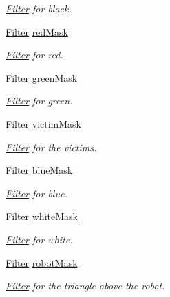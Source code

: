 \begin{DoxyCompactItemize}
\begin{DoxyCompactList}\small\item\em \mbox{\hyperlink{class_filter}{Filter}} for black. \end{DoxyCompactList}\item 
\mbox{\hyperlink{class_filter}{Filter}} \mbox{\hyperlink{class_settings_a4ded995ae1c425f92ad712d2987dce71}{red\+Mask}}
\begin{DoxyCompactList}\small\item\em \mbox{\hyperlink{class_filter}{Filter}} for red. \end{DoxyCompactList}\item 
\mbox{\hyperlink{class_filter}{Filter}} \mbox{\hyperlink{class_settings_a05138be305e15677c8a84ddf27e4d9e8}{green\+Mask}}
\begin{DoxyCompactList}\small\item\em \mbox{\hyperlink{class_filter}{Filter}} for green. \end{DoxyCompactList}\item 
\mbox{\hyperlink{class_filter}{Filter}} \mbox{\hyperlink{class_settings_ad77dc9d3ebdc000309f1279bc0f9e1ea}{victim\+Mask}}
\begin{DoxyCompactList}\small\item\em \mbox{\hyperlink{class_filter}{Filter}} for the victims. \end{DoxyCompactList}\item 
\mbox{\hyperlink{class_filter}{Filter}} \mbox{\hyperlink{class_settings_a2b425f747b936e82dfe0b609538f06f1}{blue\+Mask}}
\begin{DoxyCompactList}\small\item\em \mbox{\hyperlink{class_filter}{Filter}} for blue. \end{DoxyCompactList}\item 
\mbox{\hyperlink{class_filter}{Filter}} \mbox{\hyperlink{class_settings_adcd52fec07542a958be5adf297969db4}{white\+Mask}}
\begin{DoxyCompactList}\small\item\em \mbox{\hyperlink{class_filter}{Filter}} for white. \end{DoxyCompactList}\item 
\mbox{\hyperlink{class_filter}{Filter}} \mbox{\hyperlink{class_settings_aa814fd0ce673e73de3442e5bf5a26fc6}{robot\+Mask}}
\begin{DoxyCompactList}\small\item\em \mbox{\hyperlink{class_filter}{Filter}} for the triangle above the robot. \end{DoxyCompactList}\item 

\end{DoxyCompactItemize}
